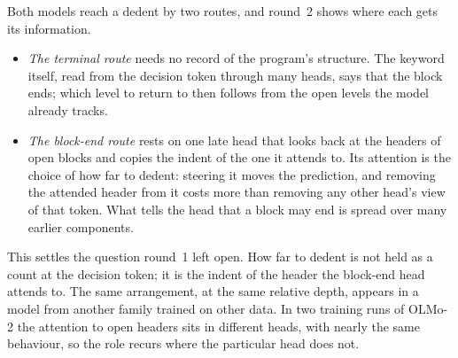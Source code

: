 \documentclass[11pt]{article}
\begin{document}
Both models reach a dedent by two routes, and round~2 shows where each gets its information.
\begin{itemize}
\item \emph{The terminal route} needs no record of the program's structure. The keyword itself, read from the decision token through many heads, says that the block ends; which level to return to then follows from the open levels the model already tracks.
\item \emph{The block-end route} rests on one late head that looks back at the headers of open blocks and copies the indent of the one it attends to. Its attention is the choice of how far to dedent: steering it moves the prediction, and removing the attended header from it costs more than removing any other head's view of that token. What tells the head that a block may end is spread over many earlier components.
\end{itemize}
This settles the question round~1 left open. How far to dedent is not held as a count at the decision token; it is the indent of the header the block-end head attends to. The same arrangement, at the same relative depth, appears in a model from another family trained on other data. In two training runs of OLMo-2 the attention to open headers sits in different heads, with nearly the same behaviour, so the role recurs where the particular head does not.
\end{document}

